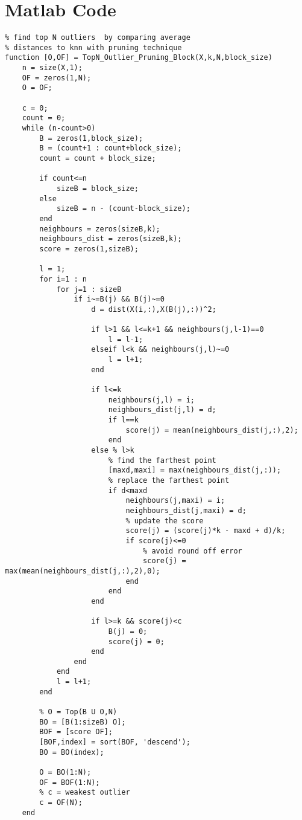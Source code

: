 \chapter{Matlab Code}
\label{apdx:matlabCode}
\lstset{language=Matlab}
\begin{lstlisting}
% find top N outliers  by comparing average 
% distances to knn with pruning technique
function [O,OF] = TopN_Outlier_Pruning_Block(X,k,N,block_size)
	n = size(X,1);
	OF = zeros(1,N);
	O = OF;

	c = 0;
	count = 0;
	while (n-count>0)
		B = zeros(1,block_size);
		B = (count+1 : count+block_size);
		count = count + block_size;        
		
		if count<=n
			sizeB = block_size;
		else
			sizeB = n - (count-block_size);
		end
		neighbours = zeros(sizeB,k);
		neighbours_dist = zeros(sizeB,k);
		score = zeros(1,sizeB);

		l = 1;
		for i=1 : n
			for j=1 : sizeB
				if i~=B(j) && B(j)~=0
					d = dist(X(i,:),X(B(j),:))^2;
		            
					if l>1 && l<=k+1 && neighbours(j,l-1)==0
						l = l-1;
					elseif l<k && neighbours(j,l)~=0
						l = l+1;
					end
		            
					if l<=k 
						neighbours(j,l) = i;   
						neighbours_dist(j,l) = d;
						if l==k
							score(j) = mean(neighbours_dist(j,:),2);
						end
					else % l>k
						% find the farthest point
						[maxd,maxi] = max(neighbours_dist(j,:));
						% replace the farthest point
						if d<maxd 
							neighbours(j,maxi) = i;
							neighbours_dist(j,maxi) = d;
							% update the score
							score(j) = (score(j)*k - maxd + d)/k;
							if score(j)<=0
								% avoid round off error
								score(j) = max(mean(neighbours_dist(j,:),2),0);
							end
						end                    
					end
		            
					if l>=k && score(j)<c
						B(j) = 0;                    
						score(j) = 0;                   
					end                                            
				end
			end
			l = l+1;
		end
		
		% O = Top(B U O,N)
		BO = [B(1:sizeB) O];
		BOF = [score OF];
		[BOF,index] = sort(BOF, 'descend');
		BO = BO(index);
		
		O = BO(1:N);
		OF = BOF(1:N);    
		% c = weakest outlier
		c = OF(N);
	end
\end{lstlisting}

